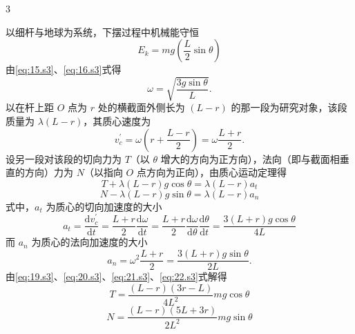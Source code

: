 \begin{solution}{3}
\begin{subsolution}
以细杆与地球为系统，下摆过程中机械能守恒
\begin{equation}
E_{k} = m g \left(\frac{L}{2} \sin \theta\right)
\label{eq:16.s3}
\end{equation}
由\eqref{eq:15.s3}、\eqref{eq:16.s3}式得
\begin{equation}
\omega = \sqrt{\frac{3g \sin \theta}{L}}.
\label{eq:17.s3}
\end{equation}
以在杆上距 $O$ 点为 $r$ 处的横截面外侧长为 $(L-r)$ 的那一段为研究对象，该段质量为 $\lambda(L-r)$，其质心速度为
\begin{equation}
v_{c}^{\prime} = \omega \left(r + \frac{L-r}{2}\right) = \omega \frac{L+r}{2}.
\label{eq:18.s3}
\end{equation}
设另一段对该段的切向力为 $T$（以 $\theta$ 增大的方向为正方向），法向（即与截面相垂直的方向）力为 $N$（以指向 $O$ 点方向为正向），由质心运动定理得
\begin{equation}
T + \lambda (L-r) g \cos \theta = \lambda (L-r) a_{t}
\label{eq:19.s3}
\end{equation}
\begin{equation}
N - \lambda (L-r) g \sin \theta = \lambda (L-r) a_{n}
\label{eq:20.s3}
\end{equation}
式中，$a_{t}$ 为质心的切向加速度的大小
\begin{equation}
a_{t} = \frac{\mathrm{d} v_{c}^{\prime}}{\mathrm{d} t} = \frac{L+r}{2} \frac{\mathrm{d} \omega}{\mathrm{d} t} = \frac{L+r}{2} \frac{\mathrm{d} \omega}{\mathrm{d} \theta} \frac{\mathrm{d} \theta}{\mathrm{d} t} = \frac{3(L+r) g \cos \theta}{4L}
\label{eq:21.s3}
\end{equation}
而 $a_{n}$ 为质心的法向加速度的大小
\begin{equation}
a_{n} = \omega^{2} \frac{L+r}{2} = \frac{3(L+r) g \sin \theta}{2L}.
\label{eq:22.s3}
\end{equation}
由\eqref{eq:19.s3}、\eqref{eq:20.s3}、\eqref{eq:21.s3}、\eqref{eq:22.s3}式解得
\begin{equation}
T = \frac{(L-r)(3r-L)}{4L^{2}} m g \cos \theta
\label{eq:23.s3}
\end{equation}
\begin{equation}
N = \frac{(L-r)(5L+3r)}{2L^{2}} m g \sin \theta
\label{eq:24.s3}
\end{equation}
\end{subsolution}
\end{solution}